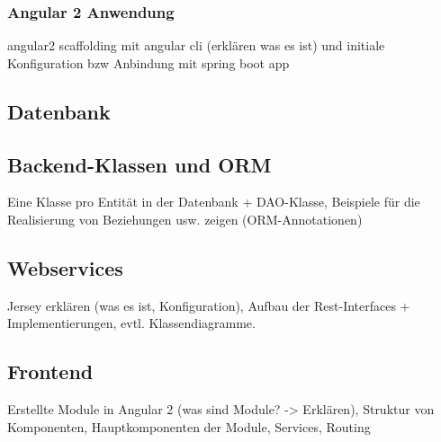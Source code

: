 \subsubsection{Angular 2 Anwendung}
angular2 scaffolding mit angular cli (erklären was es ist) und initiale Konfiguration bzw Anbindung mit spring boot app

\subsection{Datenbank}


\subsection{Backend-Klassen und ORM}
Eine Klasse pro Entität in der Datenbank + DAO-Klasse, Beispiele für die Realisierung von Beziehungen usw. zeigen (ORM-Annotationen)

\subsection{Webservices}
Jersey erklären (was es ist, Konfiguration), Aufbau der Rest-Interfaces + Implementierungen, evtl. Klassendiagramme. 

\subsection{Frontend}
Erstellte Module in Angular 2 (was sind Module? -> Erklären), Struktur von Komponenten, Hauptkomponenten der Module, Services, Routing